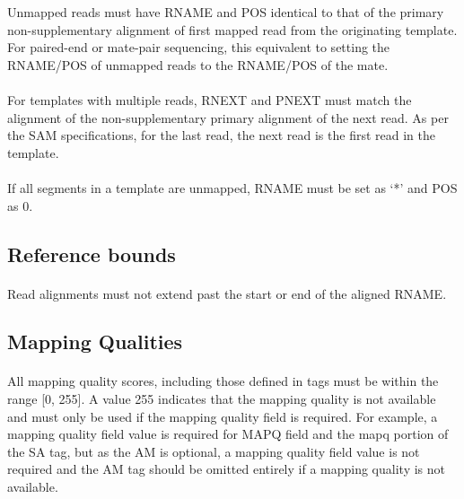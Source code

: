\documentclass[10pt]{article}
\begin{document}
Unmapped reads must have RNAME and POS identical to that of the primary
non-supplementary alignment of first mapped read from the originating template.
For paired-end or mate-pair sequencing, this equivalent
to setting the RNAME/POS of unmapped reads to the RNAME/POS of the mate.

\paragraph{}

For templates with multiple reads, RNEXT and PNEXT must match the
alignment of the non-supplementary primary alignment of the next read.
As per the SAM specifications, for the last read, the next read is the first read in the template.

\paragraph{}

If all segments in a template are unmapped, RNAME must be set as `*' and POS as 0.

\subsection{Reference bounds}

\paragraph{}

Read alignments must not extend past the start or end of the aligned RNAME.

\subsection{Mapping Qualities}

\paragraph{}

All mapping quality scores, including those defined in tags must be within the range [0, 255].
A value 255 indicates that the mapping quality is not available and must only be used if the
mapping quality field is required. For example, a mapping quality field value is required for
MAPQ field and the mapq portion of the SA tag, but as the AM is optional, a mapping quality
field value is not required and the AM tag should be omitted entirely if a mapping quality is
not available.
\end{document}
